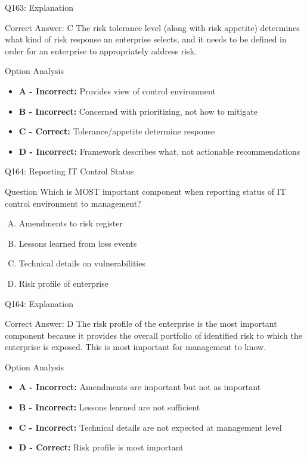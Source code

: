 \documentclass{beamer}
\begin{document}
	\begin{frame}{Q163: Explanation}
		\begin{block}{Correct Answer: C}
			The risk tolerance level (along with risk appetite) determines what kind of risk response an enterprise selects, and it needs to be defined in order for an enterprise to appropriately address risk.
		\end{block}
		\begin{block}{Option Analysis}
			\begin{itemize}
				\item \textbf{A - Incorrect:} Provides view of control environment
				\item \textbf{B - Incorrect:} Concerned with prioritizing, not how to mitigate
				\item \textbf{C - Correct:} Tolerance/appetite determine response
				\item \textbf{D - Incorrect:} Framework describes what, not actionable recommendations
			\end{itemize}
		\end{block}
	\end{frame}
	
	\begin{frame}{Q164: Reporting IT Control Status}
		\begin{block}{Question}
			Which is MOST important component when reporting status of IT control environment to management?
		\end{block}
		\begin{enumerate}[(A)]
			\item Amendments to risk register
			\item Lessons learned from loss events
			\item Technical details on vulnerabilities
			\item Risk profile of enterprise
		\end{enumerate}
	\end{frame}
	
	\begin{frame}{Q164: Explanation}
		\begin{block}{Correct Answer: D}
			The risk profile of the enterprise is the most important component because it provides the overall portfolio of identified risk to which the enterprise is exposed. This is most important for management to know.
		\end{block}
		\begin{block}{Option Analysis}
			\begin{itemize}
				\item \textbf{A - Incorrect:} Amendments are important but not as important
				\item \textbf{B - Incorrect:} Lessons learned are not sufficient
				\item \textbf{C - Incorrect:} Technical details are not expected at management level
				\item \textbf{D - Correct:} Risk profile is most important
			\end{itemize}
		\end{block}
	\end{frame}
	
\end{document}
